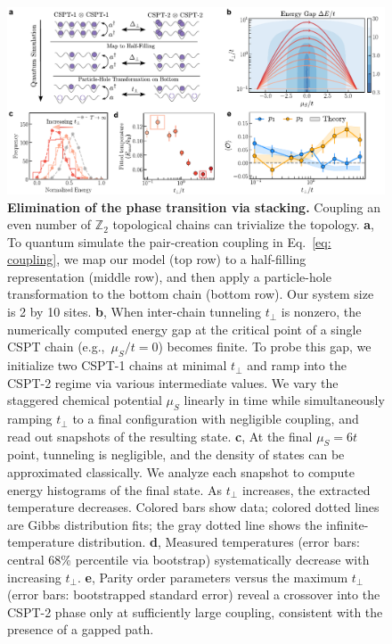 \documentclass[preprint,superscriptaddress,floatfix, nofootinbib]{revtex4-2}
\begin{document}
\begin{figure}
    \centering
    \includegraphics[width=\textwidth]{figures/Fig_stacking.pdf}
    \caption{\textbf{Elimination of the phase transition via stacking.} Coupling an even number of $\mathbb{Z}_2$ topological chains can trivialize the topology. \textbf{a}, To quantum simulate the pair-creation coupling in Eq.~\eqref{eq: coupling}, we map our model (top row) to a half-filling representation (middle row), and then apply a particle-hole transformation to the bottom chain (bottom row). Our system size is 2 by 10 sites. \textbf{b}, When inter-chain tunneling $t_\perp$ is nonzero, the numerically computed energy gap at the critical point of a single CSPT chain (e.g.,~$\mu_S/t = 0$) becomes finite. To probe this gap, we initialize two CSPT-1 chains at minimal $t_\perp$ and ramp into the CSPT-2 regime via various intermediate values. We vary the staggered chemical potential $\mu_S$ linearly in time while simultaneously ramping $t_\perp$ to a final configuration with negligible coupling, and read out snapshots of the resulting state. \textbf{c}, At the final $\mu_S = 6t$ point, tunneling is negligible, and the density of states can be approximated classically. We analyze each snapshot to compute energy histograms of the final state. As $t_\perp$ increases, the extracted temperature decreases. Colored bars show data; colored dotted lines are Gibbs distribution fits; the gray dotted line shows the infinite-temperature distribution. \textbf{d}, Measured temperatures (error bars: central 68\% percentile via bootstrap) systematically decrease with increasing $t_\perp$. \textbf{e}, Parity order parameters versus the maximum $t_\perp$ (error bars: bootstrapped standard error) reveal a crossover into the CSPT-2 phase only at sufficiently large coupling, consistent with the presence of a gapped path.
    }
    \label{fig: Coupled_CSPT}
\end{figure}
\end{document}
